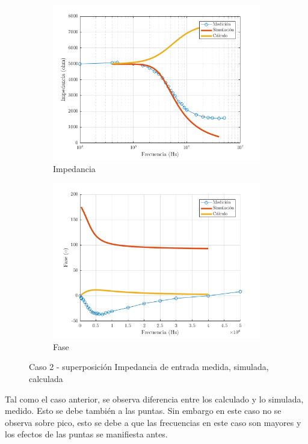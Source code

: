 \documentclass[../../main.tex]{subfiles}
\begin{document}
\begin{figure}[H]
\centering
\begin{subfigure}[http]{0.49\textwidth}
\includegraphics[width=\textwidth]{z_inv_r_c2}
\caption{Impedancia}\label{fig=zInvZc2}
\end{subfigure}
\begin{subfigure}[http]{0.49\textwidth}
\includegraphics[width=\textwidth]{z_inv_f_c2}
\caption{Fase} \label{fig=zInvFc2}
\end{subfigure}
\caption{Caso 2 - superposición Impedancia de entrada  medida, simulada, calculada}
\end{figure}

Tal como el caso anterior, se observa diferencia entre los calculado y lo simulada, medido. Esto se debe también a las puntas. Sin embargo en este caso no se observa sobre pico, esto se debe a que las frecuencias en este caso son mayores y los efectos de las puntas se manifiesta antes.
\end{document}
